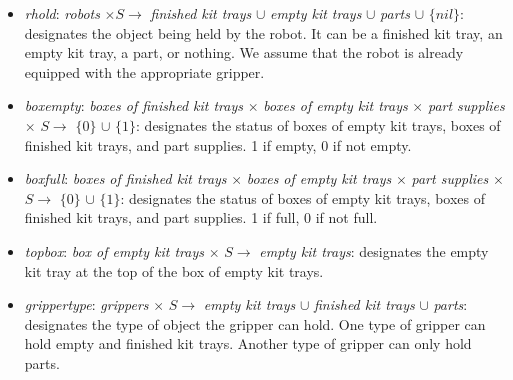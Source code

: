\begin{itemize}
\item \textit{rhold}: \textit{robots} $\times S \rightarrow$ \textit{finished kit trays} $\cup$ \textit{empty kit trays} $\cup$ \textit{parts} $\cup$ $\lbrace nil\rbrace$: designates the object being held by the robot. It can be a finished kit tray, an empty kit tray, a part, or nothing. We assume that the robot is already equipped with the appropriate gripper.

\item \textit{boxempty}: \textit{boxes of finished kit trays} $\times$ \textit{boxes of empty kit trays} $\times$ \textit{part supplies} $\times$ $S \rightarrow$ $\lbrace 0\rbrace$ $\cup$ $\lbrace 1\rbrace$: designates the status of boxes of empty kit trays, boxes of finished kit trays, and part supplies. 1 if empty, 0 if not empty.

\item \textit{boxfull}: \textit{boxes of finished kit trays} $\times$ \textit{boxes of empty kit trays} $\times$ \textit{part supplies} $\times$ $S \rightarrow$ $\lbrace 0\rbrace$ $\cup$ $\lbrace 1\rbrace$: designates the status of boxes of empty kit trays, boxes of finished kit trays, and part supplies. 1 if full, 0 if not full.

\item \textit{topbox}: \textit{box of empty kit trays} $\times$  $S \rightarrow$ \textit{empty kit trays}: designates the empty kit tray at the top of the box of empty kit trays.

\item \textit{grippertype}: \textit{grippers} $\times$ $S \rightarrow$ \textit{empty kit trays} $\cup$ \textit{finished kit trays} $\cup$ \textit{parts}: designates the type of object the gripper can hold. One type of gripper can hold empty and finished kit trays. Another type of gripper can only hold parts. 


\end{itemize}
